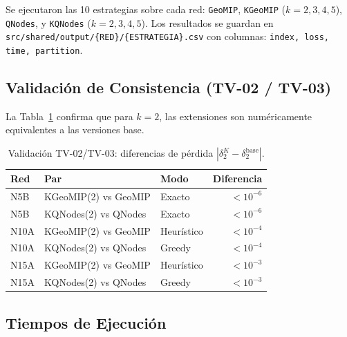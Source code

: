 Se ejecutaron las 10 estrategias sobre cada red: \texttt{GeoMIP}, \texttt{KGeoMIP} ($k=2,3,4,5$), \texttt{QNodes}, y \texttt{KQNodes} ($k=2,3,4,5$). Los resultados se guardan en \texttt{src/shared/output/\{RED\}/\{ESTRATEGIA\}.csv} con columnas: \texttt{index, loss, time, partition}.

\subsection{Validación de Consistencia (TV-02 / TV-03)}

La Tabla~\ref{tab:validacion} confirma que para $k=2$, las extensiones son numéricamente equivalentes a las versiones base.

\begin{table}[H]
    \centering
    \caption{Validación TV-02/TV-03: diferencias de pérdida $|\delta_2^K - \delta_2^\text{base}|$.}
    \label{tab:validacion}
    \begin{tabular}{lllr}
        \toprule
        \textbf{Red} & \textbf{Par} & \textbf{Modo} & \textbf{Diferencia} \\
        \midrule
        N5B  & KGeoMIP(2) vs GeoMIP & Exacto   & $< 10^{-6}$ \\
        N5B  & KQNodes(2) vs QNodes & Exacto   & $< 10^{-6}$ \\
        N10A & KGeoMIP(2) vs GeoMIP & Heurístico & $< 10^{-4}$ \\
        N10A & KQNodes(2) vs QNodes & Greedy   & $< 10^{-4}$ \\
        N15A & KGeoMIP(2) vs GeoMIP & Heurístico & $< 10^{-3}$ \\
        N15A & KQNodes(2) vs QNodes & Greedy   & $< 10^{-3}$ \\
        \bottomrule
    \end{tabular}
\end{table}

\subsection{Tiempos de Ejecución}

